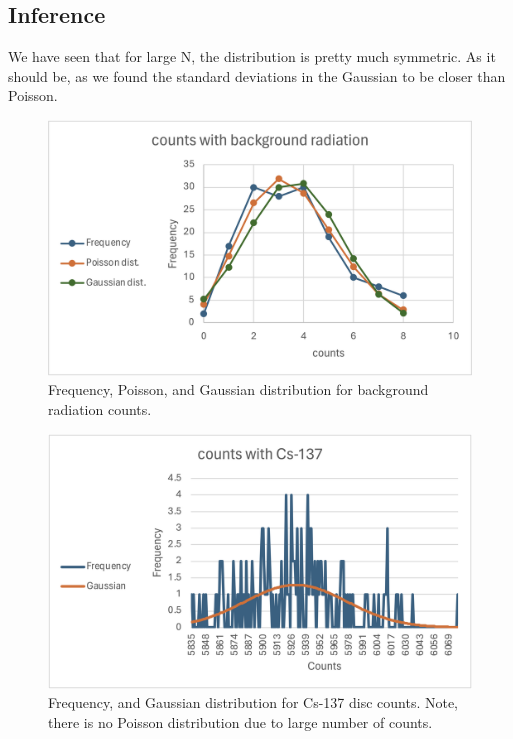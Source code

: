 \documentclass[twocolumn]{article}
\begin{document}
\subsection*{Inference}
We have seen that for large N, the distribution is pretty much symmetric. As it should be, as we found the standard deviations in the Gaussian to be closer than Poisson. 
\begin{center}

\begin{figure}[h!]
\includegraphics[scale=0.05]{lab2_a.png}
\caption{\small Frequency, Poisson, and Gaussian distribution for background radiation counts.}
\end{figure}
\begin{figure}[h!]
\includegraphics[scale=0.05]{lab2_b.png}
\caption{\small Frequency, and Gaussian distribution for Cs-137 disc counts. Note, there is no Poisson distribution due to large number of counts.}
\end{figure}
\end{center}
\end{document}
